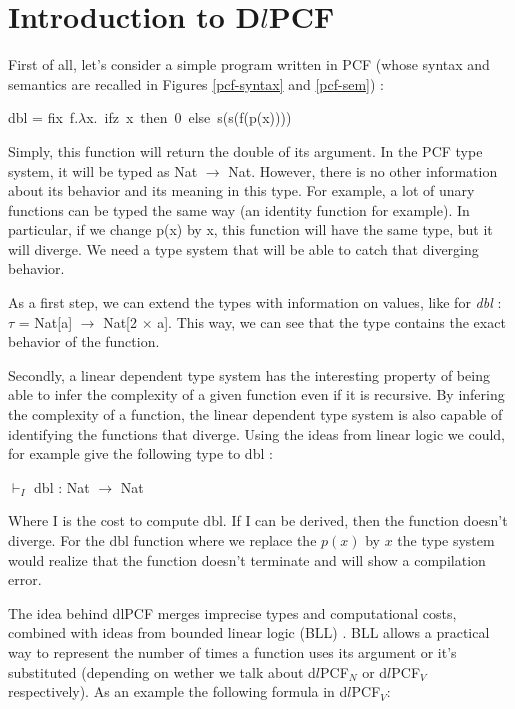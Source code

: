 \documentclass[a4paper,12pt]{article}
\begin{document}
\section{Introduction to D$l$PCF}

First of all, let's consider a simple program written in PCF (whose syntax and
semantics are recalled in Figures \ref{pcf-syntax} and \ref{pcf-sem}) :

\begin{center} 
  dbl = fix~f.$\lambda $x.~ifz~x~then~0~else~s(s(f(p(x)))) 
\end{center}

Simply, this function will return the double of its argument. In the PCF type
system, it will be typed as Nat $\rightarrow$ Nat. However, there is no other
information about its behavior and its meaning in this type. For example,
a lot of unary functions can be typed the same way (an identity function for
example). In particular, if we change p(x) by x, this function will have the
same type, but it will diverge. We need a type system that will be able to
catch that diverging behavior.

As a first step, we can extend the types with information on values,
like for \emph{dbl} : $\tau$ = Nat[a] $\rightarrow$ Nat[2 $\times$
a]. This way, we can see that the type contains the exact behavior of
the function. 

\medskip

Secondly, a linear dependent type system has the interesting property of
being able to infer the complexity of a given function even if it is
recursive. By infering the complexity of a function, the linear
dependent type system is also capable of identifying the functions that
diverge. Using the ideas from linear logic we could, for
example give the following type to dbl :

\begin{center}
$\vdash_{I}$ dbl : Nat $\rightarrow$ Nat
\end{center}

Where I is the cost to compute dbl. If I can be derived, then 
 the function doesn't diverge. For the dbl function where
we replace the $p(x)$ by $x$ the type system would realize that the function
doesn't terminate and will show a compilation error.

The idea behind dlPCF merges imprecise types and computational
costs, combined with ideas from bounded linear logic (BLL)
\cite{girard1992bounded}. BLL allows a practical way to
represent the number of times a function uses its argument or it's
substituted (depending on wether we talk about d$l$PCF$_{N}$ or 
d$l$PCF$_{V}$ respectively). As an example the following formula 
in  d$l$PCF$_{V}$:
\end{document}
